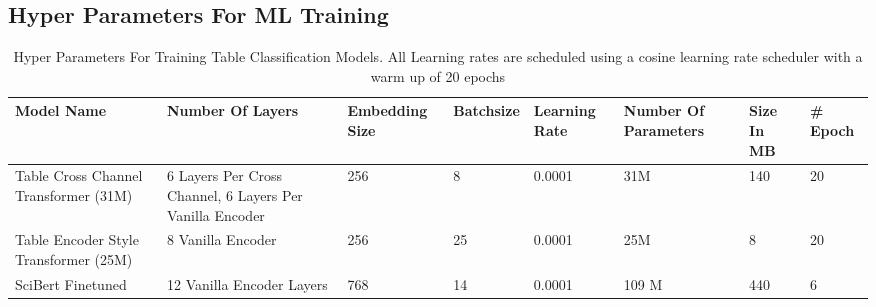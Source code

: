 \subsection{Hyper Parameters For ML Training}
\begin{table}[h]
  \label{table\arabic{tablecounter}}
  \centering
  \begin{tabular}{|p{1.25cm}|p{1.25cm}|p{1.75cm}|p{1.5cm}|p{1.5cm}|p{1.5cm}|p{1cm}|p{1cm}|}
  \hline
      Model Name & Number Of Layers &  Embedding Size & Batchsize & Learning Rate & Number Of Parameters & Size In MB & \# Epoch\\ \hline
      Table Cross Channel Transformer (31M) & 6 Layers Per Cross Channel, 6 Layers Per Vanilla Encoder & 256 & 8 & 0.0001 & 31M & 140 & 20\\ \hline
      Table Encoder Style Transformer (25M) & 8 Vanilla Encoder & 256 & 25 & 0.0001 & 25M & 8 & 20\\ \hline
      SciBert Finetuned & 12 Vanilla Encoder Layers & 768 & 14 & 0.0001 & 109 M & 440 & 6 \\ \hline
  \end{tabular}
  \caption{\label{tablecounter} Hyper Parameters For Training Table Classification Models. All Learning rates are scheduled using a cosine learning rate scheduler with a warm up of 20 epochs }
\end{table}
